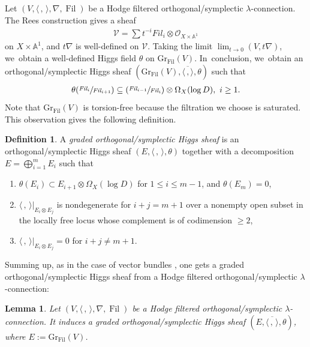 \documentclass[JEP,XML,SOM,Unicode,published]{cedram}
\newcommand{\Fil}{\textit{Fil}}
\newcommand{\Psfrac}[2]{(\sfrac{#1}{#2})}
\newcommand{\lconnection}{$\lambda$\nobreakdash-con\-nec\-tion\xspace}
\DeclareMathOperator{\Filt}{Fil}
\newcommand{\Gr}{\mathrm{Gr}}
\theoremstyle{plain}
\newtheorem{lem}[thm]{Lemma}
\theoremstyle{definition}
\newtheorem{defn}[thm]{Definition}
\begin{document}
Let $(V, \langle \,, \, \rangle,\nabla, \Filt)$ be a Hodge filtered orthogonal/symplectic \lconnection. The Rees construction gives a sheaf\vspace*{-3pt}
\begin{align*}
\mathcal{V}= \sum t^{-i} \Fil_{i} \otimes \mathcal{O}_{X \times \mathbb{A}^1}
\end{align*}
on $X \times \mathbb{A}^1$, and $t \nabla$ is well-defined on $\mathcal{V}$. Taking the limit $\lim_{t \to 0} (V,t\nabla)$, we~obtain a well-defined Higgs field $\theta$ on $\Gr_{\Filt}(V)$. In~conclusion, we~obtain an orthogonal/symplectic Higgs sheaf $(\Gr_{\Filt}(V), \overline{\langle \,, \rangle}, \theta)$ such that
\begin{align*}
\theta( \sfrac{\Fil_i}{\Fil_{i+1}} ) \subseteq \Psfrac{\Fil_{i-1}}{\Fil_{i}} \otimes \Omega_X(\log D), \ i \geq 1.
\end{align*}
Note that $\Gr_{\Filt}(V)$ is torsion-free because the filtration we choose is saturated. This observation gives the following definition.

\begin{defn}
A \emph{graded orthogonal/symplectic Higgs sheaf} is an orthogonal/symplectic Higgs sheaf $(E, \langle \,, \, \rangle,\theta)$ together with a decomposition $E=\mathop{\bigoplus}_{i=1}^{m} E_i$ such that
\begin{enumerate}
\item $\theta(E_i)\subset E_{i+1}\otimes \Omega_X(\log D)$ for $ 1\leq i\leq m-1$, and $\theta(E_m)=0$,

\item $\langle \,, \, \rangle|_{E_i\otimes E_j}$ is nondegenerate for $i+j=m+1$ over a nonempty open subset in the locally free locus whose complement is of codimension $\geq 2$,

\item $\langle \,, \, \rangle|_{E_i\otimes E_j}=0$ for $i+j\neq m+1$.
\end{enumerate}
\end{defn}

Summing up, as in the case of vector bundles \cite{S10}, one gets a graded orthogonal/symplectic Higgs sheaf from a Hodge filtered orthogonal/symplectic \lconnection:

\begin{lem}
Let $(V, \langle \,, \, \rangle,\nabla, \Filt)$ be a Hodge filtered orthogonal/symplectic \lconnection. It induces a graded orthogonal/symplectic Higgs sheaf $(E,\overline{\langle \,, \, \rangle},\theta)$, where $E:=\Gr_{\Filt}(V)$.
\end{lem}
\end{document}
